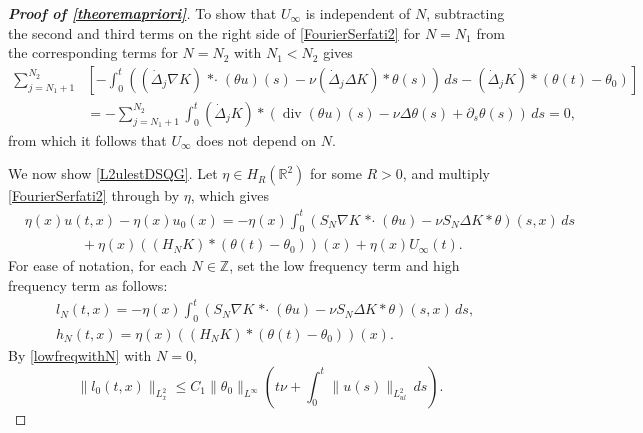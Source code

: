 \documentclass[11pt,reqno,xcolor=svgnames]{amsart}
\def\R{{\mathbb R}}
\def\Z{{\mathbb Z}}
\theoremstyle{plain}
\theoremstyle{definition}
\theoremstyle{plain}
\theoremstyle{remark}
\DeclareMathOperator{\dv}{div}
\newcommand{\grad}{\ensuremath{\nabla}}
\newcommand{\prt}{\ensuremath{\partial}}
\newcommand{\brac}[1]{\ensuremath{\left[ #1 \right]}}
\newcommand{\stardot}{{\mathop{* \cdot}}}
\newcommand{\Del}{\dot{\Delta}}
\begin{document}
\begin{proof}[\textbf{Proof of \cref{theoremapriori}}]
To show that $U_{\infty}$ is independent of $N$, subtracting the second and third terms on the right side of \cref{FourierSerfati2} for $N=N_1$ from the corresponding terms for $N=N_2$ with $N_1 < N_2$ gives
\begin{align*}
    \sum_{j = N_1 + 1}^{N_2}
            &\brac{
                -\int_0^t
                ((\Del_j \grad K) \stardot (\theta u)(s) - \nu (\Del_j\Delta K) \ast \theta(s) ) \, ds
                    - (\Del_j K) * (\theta(t) - \theta_0)
            } \\
        &= -\sum_{j = N_1 + 1}^{N_2}
                \int_0^t (\Del_j K) * (\dv(\theta u)(s) - \nu\Delta\theta(s) + \prt_s \theta(s)) \, ds
        = 0,
\end{align*}
from which it follows that $U_{\infty}$ does not depend on $N$.

We now show \cref{L2ulestDSQG}. Let $\eta\in H_R(\R^2)$ for some $R>0$, and multiply \cref{FourierSerfati2} through by $\eta$, which gives
\begin{equation}\label{prelim}
\begin{split}
&\eta(x) u(t,x) - \eta(x) u_0(x) = -\eta(x)\int_0^t \left( S_{N}\nabla K \stardot (\theta u)  - \nu S_{N}\Delta K \ast \theta\right)(s,x) \, ds\\
&\qquad\qquad  + \eta(x)((H_NK) \ast (\theta(t) - \theta_0))(x) + \eta(x)U_{\infty}(t).
\end{split}
\end{equation} 
For ease of notation, for each $N\in\Z$, set the low frequency term and high frequency term as follows:
\begin{equation} \label{ln:def-of-I-and-II}
\begin{split}
&l_N(t,x) = -\eta(x)\int_0^t \left( S_{N}\nabla K \stardot (\theta u)  - \nu S_{N}\Delta K \ast \theta\right)(s,x) \, ds,\\
&h_N(t,x) = \eta(x)((H_NK) \ast (\theta(t) - \theta_0))(x).
\end{split}
\end{equation}
By \cref{lowfreqwithN} with $N=0$,
$$ \| l_0(t,x) \|_{L^2_x} \leq C_1\| \theta_0 \|_{L^{\infty}}\left(t\nu + \int_0^t \| u(s) \|_{L^2_{ul}}\, ds \right).$$


\end{proof}
\end{document}
